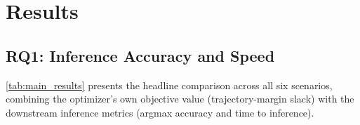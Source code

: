 \documentclass[letterpaper, 10pt, conference]{ieeeconf}
\begin{document}
\section{Results}
\label{sec:results}

\subsection{RQ1: Inference Accuracy and Speed}
\label{sec:rq1_results}

\cref{tab:main_results} presents the headline comparison across all
six scenarios, combining the optimizer's own objective value
(trajectory-margin slack) with the downstream inference metrics
(argmax accuracy and time to inference).
\end{document}
